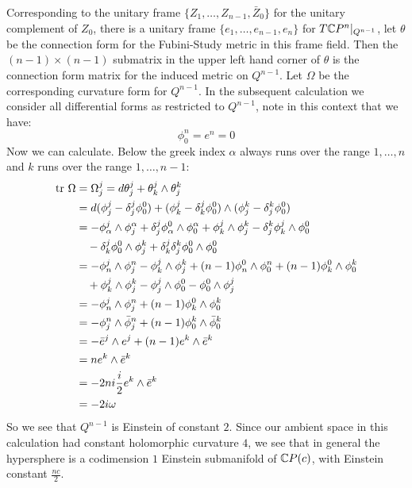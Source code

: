 Corresponding to the unitary frame $\{ Z_1, \ldots, Z_{n-1}, \bar{Z}_0 \}$ for the unitary complement of $Z_0$, there is a unitary frame $ \{ e_1, \ldots, e_{n-1}, e_n \} $ for $T \mathbb{C}P^{n} |_{Q^{n-1}}$, let $\theta$ be the connection form for the Fubini-Study metric in this frame field.  Then the $(n-1) \times (n-1)$ submatrix in the upper left hand corner of $\theta$ is the connection form matrix for the induced metric on $Q^{n-1}$.  Let $\Omega$ be the corresponding curvature form for $Q^{n-1}$.  In the subsequent calculation we consider all differential forms as restricted to $Q^{n-1}$, note in this context that we have:
%
$$ \phi^n_0 = e^n = 0 $$
%
Now we can calculate.  Below the greek index $\alpha$ always runs over the range $1,\ldots,n$ and $k$ runs over the range $1,\ldots,n-1$:
%
\begin{align*}
\tr \ \Omega &= \Omega^j_j = d \theta^j_j + \theta^j_k \wedge \theta^k_j \\
&= d( \phi^j_j - \delta^j_j \phi^0_0 ) + ( \phi^j_k - \delta^j_k \phi^0_0 ) \wedge ( \phi^k_j - \delta^k_j \phi^0_0 ) \\
%
&= - \phi^j_\alpha \wedge \phi^\alpha_j + \delta^j_j \phi^0_\alpha \wedge \phi^\alpha_0 + \phi^j_k \wedge \phi^k_j - \delta^k_j \phi^j_k \wedge \phi^0_0 \\
& \quad  - \delta^j_k \phi^0_0 \wedge \phi^k_j + \delta^j_k \delta^k_j \phi^0_0 \wedge \phi^0_0 \\
%
&= - \phi^j_n \wedge \phi^n_j - \phi^j_k \wedge \phi^k_j + (n-1) \phi^0_n \wedge \phi^n_0 + (n-1) \phi^0_k \wedge \phi^k_0 \\
& \quad + \phi^j_k \wedge \phi^k_j -  \phi^j_j \wedge \phi^0_0 - \phi^0_0 \wedge \phi^j_j \\
%
&= - \phi^j_n \wedge \phi^n_j + (n-1) \phi^0_k \wedge \phi^k_0 \\
&= - \phi^n_j \wedge \bar{\phi}^n_j + (n-1) \phi^k_0 \wedge \bar{\phi}^k_0 \\
&= - \bar{e}^j \wedge e^j + (n-1) e^k \wedge \bar{e}^k \\
&= n e^k \wedge \bar{e}^k \\
&= - 2 n i \frac{i}{2} e^k \wedge \bar{e}^k \\
&= - 2 i \omega
\end{align*}
%
So we see that $Q^{n-1}$ is Einstein of constant $2$.  Since our ambient space in this calculation had constant holomorphic curvature $4$, we see that in general the hypersphere is a codimension $1$ Einstein submanifold of $\mathbb{C} P(c)$, with Einstein constant $\frac{nc}{2}$.
